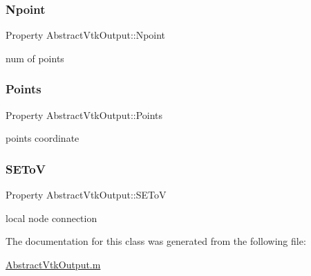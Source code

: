 \subsubsection{\texorpdfstring{Npoint}{Npoint}}
{\footnotesize\ttfamily Property Abstract\+Vtk\+Output\+::\+Npoint\hspace{0.3cm}{\ttfamily [protected]}}



num of points 

\mbox{\label{class_abstract_vtk_output_a670d942756e3bcd26d401d61c4c23b28}} 
\subsubsection{\texorpdfstring{Points}{Points}}
{\footnotesize\ttfamily Property Abstract\+Vtk\+Output\+::\+Points\hspace{0.3cm}{\ttfamily [protected]}}



points coordinate 

\mbox{\label{class_abstract_vtk_output_a98e917a839500981878bc18d1d10e786}} 
\subsubsection{\texorpdfstring{S\+E\+ToV}{SEToV}}
{\footnotesize\ttfamily Property Abstract\+Vtk\+Output\+::\+S\+E\+ToV\hspace{0.3cm}{\ttfamily [protected]}}



local node connection 



The documentation for this class was generated from the following file\+:\begin{DoxyCompactItemize}
\item 
\hyperlink{_abstract_vtk_output_8m}{Abstract\+Vtk\+Output.\+m}\end{DoxyCompactItemize}
